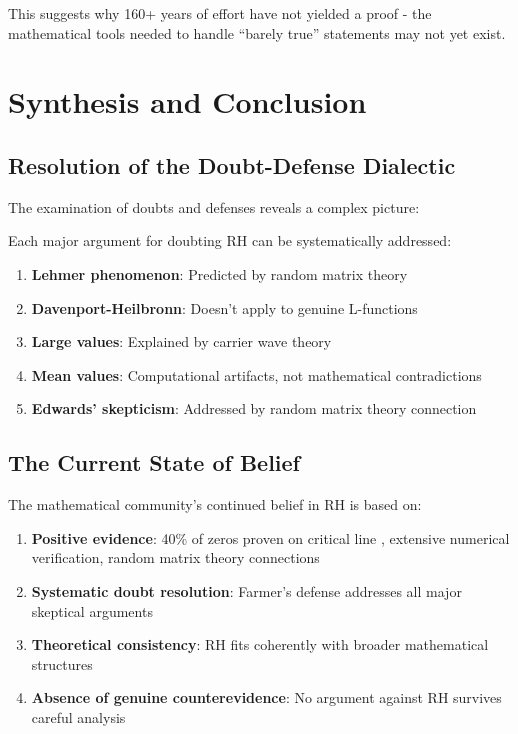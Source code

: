 This suggests why 160+ years of effort have not yielded a proof - the mathematical tools needed to handle ``barely true'' statements may not yet exist.

\section{Synthesis and Conclusion}
\label{sec:synthesis}

\subsection{Resolution of the Doubt-Defense Dialectic}
\label{subsec:dialectic_resolution}

The examination of doubts and defenses reveals a complex picture:

\begin{theorem}
Each major argument for doubting RH can be systematically addressed:
\begin{enumerate}
\item \textbf{Lehmer phenomenon}: Predicted by random matrix theory
\item \textbf{Davenport-Heilbronn}: Doesn't apply to genuine L-functions  
\item \textbf{Large values}: Explained by carrier wave theory
\item \textbf{Mean values}: Computational artifacts, not mathematical contradictions
\item \textbf{Edwards' skepticism}: Addressed by random matrix theory connection
\end{enumerate}
\end{theorem}

\subsection{The Current State of Belief}
\label{subsec:current_belief}

\begin{theorem}
The mathematical community's continued belief in RH is based on:
\begin{enumerate}
\item \textbf{Positive evidence}: 40\% of zeros proven on critical line \cite{conrey1989}, extensive numerical verification, random matrix theory connections
\item \textbf{Systematic doubt resolution}: Farmer's defense addresses all major skeptical arguments
\item \textbf{Theoretical consistency}: RH fits coherently with broader mathematical structures
\item \textbf{Absence of genuine counterevidence}: No argument against RH survives careful analysis
\end{enumerate}
\end{theorem}

